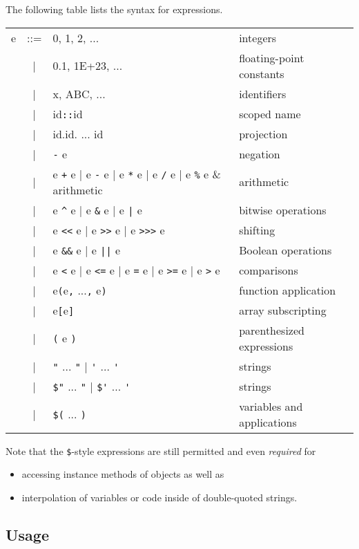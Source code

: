 The following table lists the syntax for expressions.

\begin{tabular}{rcll}
e & ::= & 0, 1, 2, ...    & integers\\
  & |   & 0.1, 1E+23, ... & floating-point constants\\
  & |   & x, ABC, ...     & identifiers\\
  & |   & id\verb+::+id   & scoped name\\
  & |   & id.id. ... id   & projection\\
  & |   & \verb+-+ e      & negation\\
  & |   & e \verb/+/ e | e \verb/-/ e | e \verb+*+ e | e \verb+/+ e | e \verb+%+ e  & arithmetic\\
  & |   & e \verb+^+ e | e \verb+&+ e | e \verb+|+ e & bitwise operations\\
  & |   & e \verb+<<+ e  | e \verb+>>+  e | e \verb+>>>+ e & shifting\\
  & |   & e \verb+&&+ e  | e \verb+||+ e & Boolean operations\\
  & |   & e \verb+<+ e | e \verb+<=+ e | e \verb+=+ e | e \verb+>=+ e | e \verb+>+ e & comparisons\\
  & |   & e\verb+(+e\verb+,+ ...\verb+,+ e\verb+)+ & function application\\
  & |   & e\verb+[+e\verb+]+ & array subscripting\\
  & |   & \verb+(+ e \verb+)+ & parenthesized expressions\\
  & |   & \verb+"+ ... \verb+"+ | \verb+'+ ... \verb+'+ & strings\\
  & |   & \verb+$"+ ... \verb+"+ | \verb+$'+ ... \verb+'+ & strings\\
  & |   & \verb+$(+ ... \verb+)+ & variables and applications
\end{tabular}

Note that the \verb+$+-style expressions are still permitted and even
\emph{required} for

\begin{itemize}
\item accessing instance methods of objects as well as
\item interpolation of variables or code inside of double-quoted
  strings.
\end{itemize}

\subsection{Usage}

